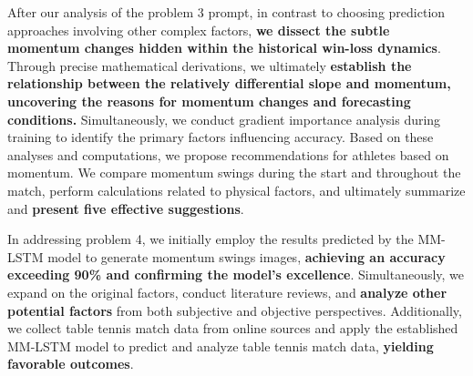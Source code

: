 After our analysis of the problem 3 prompt, in contrast to choosing prediction approaches involving other complex factors,\textbf{ we dissect the subtle momentum changes hidden within the historical win-loss dynamics}. Through precise mathematical derivations, we ultimately \textbf{establish the relationship between the relatively differential slope and momentum, uncovering the reasons for momentum changes and forecasting conditions.} Simultaneously, we conduct gradient importance analysis during training to identify the primary factors influencing accuracy. Based on these analyses and computations, we propose recommendations for athletes based on momentum. We compare momentum swings during the start and throughout the match, perform calculations related to physical factors, and ultimately summarize and \textbf{present five effective suggestions}.


In addressing problem 4, we initially employ the results predicted by the MM-LSTM model to generate momentum swings images, \textbf{achieving an accuracy exceeding 90\% and confirming the model's excellence}. Simultaneously, we expand on the original factors, conduct literature reviews, and \textbf{analyze other potential factors} from both subjective and objective perspectives. Additionally, we collect table tennis match data from online sources and apply the established MM-LSTM model to predict and analyze table tennis match data,\textbf{ yielding favorable outcomes}.

